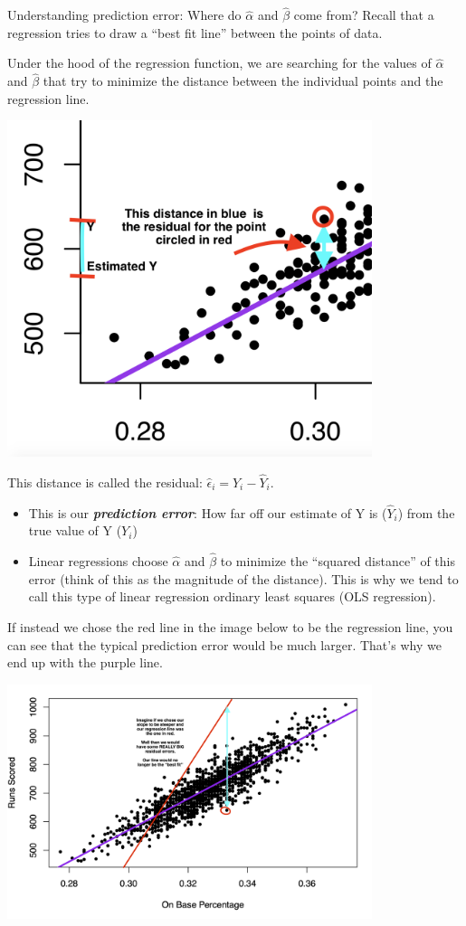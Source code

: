 \documentclass[
  letterpaper,
  DIV=11,
  numbers=noendperiod]{scrreprt}
\providecommand{\tightlist}{%
  \setlength{\itemsep}{0pt}\setlength{\parskip}{0pt}}\usepackage{longtable,booktabs,array}
\begin{document}
Understanding prediction error: Where do \(\hat \alpha\) and
\(\hat \beta\) come from? Recall that a regression tries to draw a
``best fit line'' between the points of data.

Under the hood of the regression function, we are searching for the
values of \(\hat \alpha\) and \(\hat \beta\) that try to minimize the
distance between the individual points and the regression line.

\includegraphics[width=0.8\textwidth,height=\textheight]{images/residual.png}

This distance is called the residual:
\(\hat \epsilon_i = Y_i - \hat Y_i\).

\begin{itemize}
\tightlist
\item
  This is our \textbf{\emph{prediction error}}: How far off our estimate
  of Y is (\(\hat Y_i\)) from the true value of Y (\(Y_i\))
\item
  Linear regressions choose \(\hat \alpha\) and \(\hat \beta\) to
  minimize the ``squared distance'' of this error (think of this as the
  magnitude of the distance). This is why we tend to call this type of
  linear regression ordinary least squares (OLS regression).
\end{itemize}

If instead we chose the red line in the image below to be the regression
line, you can see that the typical prediction error would be much
larger. That's why we end up with the purple line.

\includegraphics[width=0.8\textwidth,height=\textheight]{images/bestfit.png}
\end{document}
